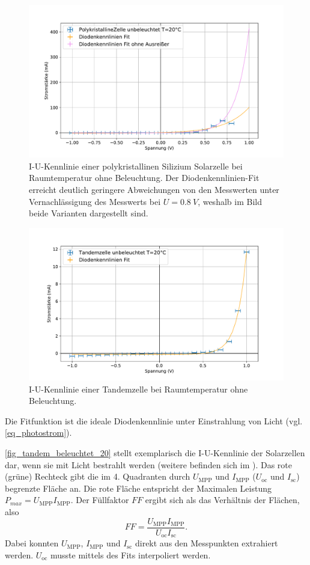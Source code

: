 \documentclass[
	a4paper,
	12pt,
	pagesize,
	ngerman
]{scrartcl}
\begin{document}
	\begin{figure}[H]
			\includegraphics[width=.9\linewidth]{img/PolykristallineZelle_unbeleuchtet_20.pdf}
			\caption{
				I-U-Kennlinie einer polykristallinen Silizium Solarzelle bei Raumtemperatur ohne Beleuchtung.
				Der Diodenkennlinien-Fit erreicht deutlich geringere Abweichungen von den Messwerten unter Vernachlässigung des Messwerts bei $U=\SI{0.8}{V}$, weshalb im Bild beide Varianten dargestellt sind.
								}
			\label{fig_poly_unbeleuchtet_20}
	\end{figure}

	\begin{figure}[H]
			\includegraphics[width=.9\linewidth]{img/Tandemzelle_unbeleuchtet_20.pdf}
			\caption{
				I-U-Kennlinie einer Tandemzelle bei Raumtemperatur ohne Beleuchtung.
								}
			\label{fig_tandem_unbeleuchtet_20}
	\end{figure}

	Die Fitfunktion ist die ideale Diodenkennlinie unter Einstrahlung von Licht (vgl. \cref{eq_photostrom}).

	\cref{fig_tandem_beleuchtet_20} stellt exemplarisch die I-U-Kennlinie der Solarzellen dar, wenn sie mit Licht bestrahlt werden (weitere befinden sich im ).
	Das rote (grüne) Rechteck gibt die im 4. Quadranten durch $U_\text{MPP}$ und $I_\text{MPP}$ ($U_\text{oc}$ und $I_\text{sc}$) begrenzte Fläche an.
	Die rote Fläche entspricht der Maximalen Leistung $P_{max} = U_\text{MPP}I_\text{MPP}$.
	Der Füllfaktor $FF$ ergibt sich als das Verhältnis der Flächen, also
	\begin{equation}
		FF = \frac{U_\text{MPP}I_\text{MPP}}{U_\text{oc}I_\text{sc}}.
	\end{equation}
	Dabei konnten $U_\text{MPP}$, $I_\text{MPP}$ und $I_\text{sc}$ direkt aus den Messpunkten extrahiert werden.
	$U_\text{oc}$ musste mittels des Fits interpoliert werden.
\end{document}
